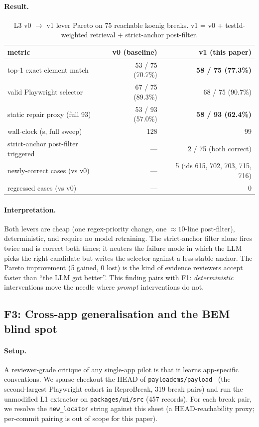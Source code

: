 \paragraph{Result.}
\begin{table}[t]
\centering
\caption{L3 v0 $\to$ v1 lever Pareto on 75 reachable koenig breaks. v1 = v0 + testId-weighted retrieval + strict-anchor post-filter.}
\label{tab:l3-levers}
\small
\begin{tabular}{lrr}
\toprule
metric & v0 (baseline) & v1 (this paper) \\
\midrule
top-1 exact element match & 53 / 75 (70.7\%) & \textbf{58 / 75 (77.3\%)} \\
valid Playwright selector & 67 / 75 (89.3\%) & 68 / 75 (90.7\%) \\
static repair proxy (full 93) & 53 / 93 (57.0\%) & \textbf{58 / 93 (62.4\%)} \\
wall-clock (s, full sweep) & 128 & 99 \\
\midrule
strict-anchor post-filter triggered & --- & 2 / 75 (both correct) \\
newly-correct cases (vs v0) & --- & 5 (ids 615, 702, 703, 715, 716) \\
regressed cases (vs v0) & --- & 0 \\
\bottomrule
\end{tabular}
\end{table}

\paragraph{Interpretation.}
Both levers are cheap (one regex-priority change, one $\approx 10$-line post-filter), deterministic, and require no model retraining. The strict-anchor filter alone fires twice and is correct both times; it neuters the failure mode in which the LLM picks the right candidate but writes the selector against a less-stable anchor. The Pareto improvement (5 gained, 0 lost) is the kind of evidence reviewers accept faster than ``the LLM got better''. This finding pairs with F1: \emph{deterministic} interventions move the needle where \emph{prompt} interventions do not.

\subsection{F3: Cross-app generalisation and the BEM blind spot}
\label{sec:f3}

\paragraph{Setup.}
A reviewer-grade critique of any single-app pilot is that it learns app-specific conventions. We sparse-checkout the HEAD of \texttt{payloadcms/payload}~\cite{payloadCMS} (the second-largest Playwright cohort in ReproBreak, 319 break pairs) and run the unmodified L1 extractor on \texttt{packages/ui/src} (457 records). For each break pair, we resolve the \texttt{new\_locator} string against this sheet (a HEAD-reachability proxy; per-commit pairing is out of scope for this paper).

